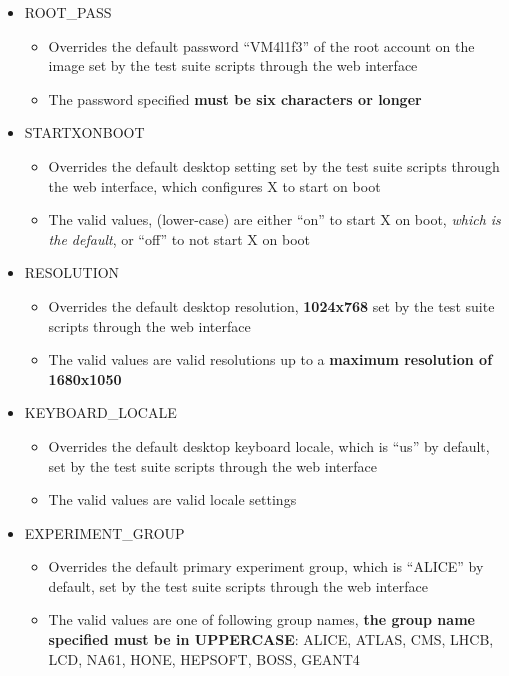 \begin{itemize}
\item	ROOT\_PASS
		\begin{itemize}
		\item	Overrides the default password ``VM4l1f3'' of the root account
				on the \cernvm image set by the test suite scripts through the
				web interface
		\item	The password specified {\bf must be six characters or longer}
		\end{itemize}
		
\item	STARTXONBOOT
		\begin{itemize}
		\item	Overrides the default \cernvm desktop setting set by the test 
				suite scripts through the web interface, which configures X to
				start on boot
		\item	The valid values, (lower-case) are either ``on'' to start X on boot,
				\emph{which is the default}, or ``off'' to not start X on boot		
		\end{itemize}
				
\item	RESOLUTION
		\begin{itemize}
		\item	Overrides the default \cernvm desktop resolution, {\bf 1024x768} set by
				the test suite scripts through the web interface
		\item	The valid values are valid resolutions up to a {\bf maximum resolution
				of 1680x1050}
		\end{itemize}

\item	KEYBOARD\_LOCALE
		\begin{itemize}
		\item	Overrides the default \cernvm desktop keyboard locale, which is ``us'' by
				default, set by the test suite scripts through the web interface
		\item	The valid values are valid locale settings
		\end{itemize}

\item	EXPERIMENT\_GROUP
		\begin{itemize}
		\item	Overrides the default \cernvm primary experiment group, which is ``ALICE''
				by default, set by the test suite scripts through the web interface
		\item	The valid values are one of following group names, {\bf the group name
				specified must be in UPPERCASE}: ALICE, ATLAS, CMS, LHCB, LCD, NA61, HONE,
				HEPSOFT, BOSS, GEANT4	
		\end{itemize}
\end{itemize}


